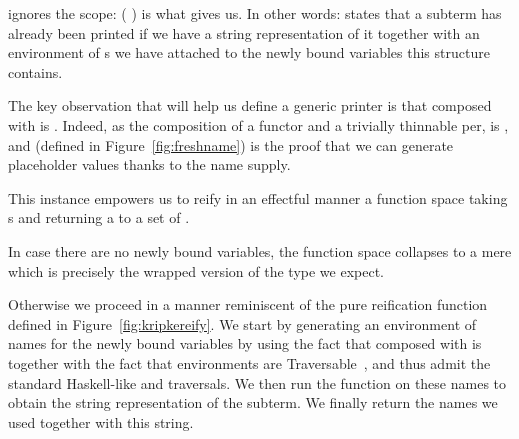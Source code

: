 ignores the scope: ({ \AF{++} }) is what  gives us.
%
In other words:  states that a subterm has already been printed
if we have a string representation of it together with an environment of
s we have attached to the newly bound variables this structure
contains.
%
\begin{agdasnippet}
\end{agdasnippet}
%
The key observation that will help us define a generic printer is that
 composed with  is . Indeed, as the
composition of a functor and a trivially thinnable per,
 is , and  (defined in
Figure~\ref{fig:freshname}) is the proof that we can generate
placeholder values thanks to the name supply.

\begin{agdasnippet}
\end{agdasnippet}

This  instance empowers us to reify in an effectful manner
a  function space taking s and returning a 
to a set of .

\begin{agdasnippet}
\end{agdasnippet}

In case there are no newly bound variables, the  function space
collapses to a mere  which is precisely the wrapped version of
the type we expect.

\begin{agdasnippet}
\end{agdasnippet}

Otherwise we proceed in a manner reminiscent of the pure reification function
defined in Figure~\ref{fig:kripkereify}. We start by generating an environment
of names for the newly bound variables by using the fact that  composed
with  is  together with the fact that environments are
Traversable~\cite{mcbride_paterson_2008}, %
and thus admit the standard Haskell-like  and 
traversals. %
We then run the  function
on these names to obtain the string representation of the subterm. We finally
return the names we used together with this string.

